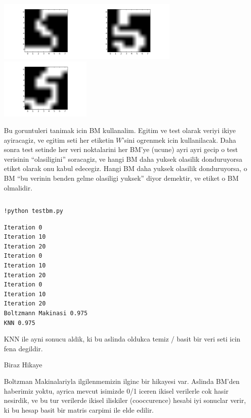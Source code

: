 \documentclass[12pt,fleqn]{article}\usepackage{../common}
\begin{document}
\includegraphics[height=3cm]{boltzmann_01.png}\includegraphics[height=3cm]{boltzmann_02.png}\includegraphics[height=3cm]{boltzmann_03.png}


Bu goruntuleri tanimak icin BM kullanalim. Egitim ve test olarak veriyi
ikiye ayiracagiz, ve egitim seti her etiketin $W$'sini ogrenmek icin
kullanilacak. Daha sonra test setinde her veri noktalarini her BM'ye
(ucune) ayri ayri gecip o test verisinin ``olasiligini'' soracagiz, ve
hangi BM daha yuksek olasilik donduruyorsa etiket olarak onu kabul
edecegiz. Hangi BM daha yuksek olasilik donduruyorsa, o BM ``bu verinin
benden gelme olasiligi yuksek'' diyor demektir, ve etiket o BM olmalidir. 

\inputminted[fontsize=\footnotesize]{python}{testbm.py}

\begin{verbatim}
!python testbm.py
\end{verbatim}

\begin{verbatim}
Iteration 0
Iteration 10
Iteration 20
Iteration 0
Iteration 10
Iteration 20
Iteration 0
Iteration 10
Iteration 20
Boltzmann Makinasi 0.975
KNN 0.975
\end{verbatim}

KNN ile ayni sonucu aldik, ki bu aslinda oldukca temiz / basit bir veri
seti icin fena degildir. 

Biraz Hikaye

Boltzman Makinalariyla ilgilenmemizin ilginc bir hikayesi var. Aslinda
BM'den haberimiz yoktu, ayrica mevcut isimizde 0/1 iceren ikisel verilerle
cok hasir nesirdik, ve bu tur verilerde ikisel iliskiler (cooccurence)
hesabi iyi sonuclar verir, ki bu hesap basit bir matris carpimi ile elde
edilir.
\end{document}
